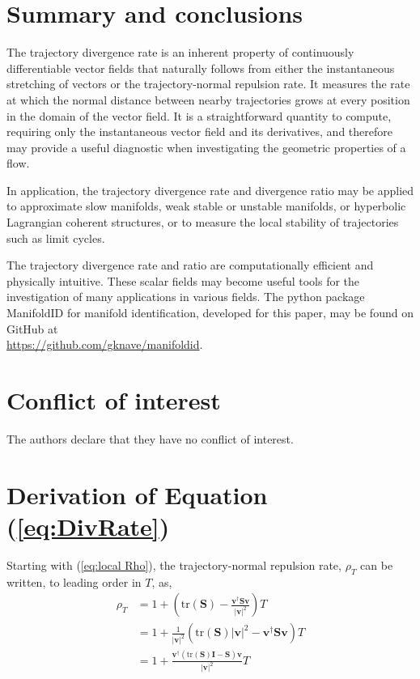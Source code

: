 \documentclass[twocolumn]{svjour3}
\begin{document}
\section{Summary and conclusions}\label{s:Summary}	
The trajectory divergence rate is an inherent property of continuously differentiable vector fields that naturally follows from either the instantaneous stretching of vectors or the trajectory-normal repulsion rate. It measures the rate at which the normal distance between nearby trajectories grows at every position in the domain of the vector field. It is a straightforward quantity to compute, requiring only the instantaneous vector field and its derivatives, and therefore may provide a useful diagnostic when investigating the geometric properties of a flow.

In application, the trajectory divergence rate and divergence ratio may be applied to approximate slow manifolds, weak stable or unstable manifolds, or hyperbolic Lagrangian coherent structures, or to measure the local stability of trajectories such as limit cycles.

The trajectory divergence rate and ratio are computationally efficient and physically intuitive. These scalar fields may become useful tools for the investigation of many applications in various fields. The python package ManifoldID for manifold identification, developed for this paper, may be found on GitHub at \\ \href{https://github.com/gknave/manifoldid}{https://github.com/gknave/manifoldid}.

\section*{Conflict of interest}
The authors declare that they have no conflict of interest.

%	

%	


\appendix

\section{Derivation of Equation (\ref{eq:DivRate})} \label{ap: normal derivation}
Starting with (\ref{eq:local Rho}), the trajectory-normal repulsion rate, \(\rho_T\) can be written, to leading order in $T$, as,
\begin{equation}
\begin{aligned}
\rho_T &= 1+ \left(\text{tr}(\mathbf{S})-\frac{\mathbf{v}^\dagger\mathbf{S}\mathbf{v}}{\left|\mathbf{v}\right|^2}\right)T \\
&= 1+ \frac{1}{\left|\mathbf{v}\right|^2}(\text{tr}(\mathbf{S})\left|\mathbf{v}\right|^2-\mathbf{v}^\dagger\mathbf{S}\mathbf{v})T  \\
&= 1+ \frac{\mathbf{v}^\dagger(\text{tr}(\mathbf{S})\mathbf{I} - \mathbf{S})\mathbf{v}}{\left|\mathbf{v}\right|^2}T
\end{aligned}
\end{equation}
\end{document}
